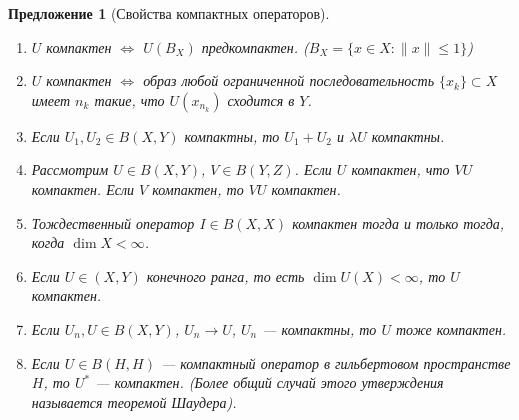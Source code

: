 \documentclass[11pt,openany,a4paper]{scrartcl}
\theoremstyle{plain}
\newtheorem{proposition}[theorem]{Предложение}
\theoremstyle{definition}
\begin{document}
\begin{proposition}[Свойства компактных операторов]
\mbox{}
    \begin{enumerate}
        \item $U$ компактен $\iff$ $U(B_X)$ предкомпактен.
        ($B_X = \{x \in X: \|x\| \leqslant 1\}$)
        \item $U$ компактен $\iff$ образ любой ограниченной последовательность
        $\{x_k\}\subset X$ имеет $n_k$ такие, что $U(x_{n_k})$ сходится в $Y$.
        \item Если $U_1, U_2 \in B(X, Y)$ компактны, то $U_1 + U_2$ и $\lambda U$ компактны.
        \item \label{compact_product}
        Рассмотрим $U \in B(X, Y)$, $V \in B(Y, Z)$. Если $U$ компактен, что $VU$ компактен.
        Если $V$ компактен, то $VU$ компактен.
        \item Тождественный оператор $I \in B(X, X)$ компактен тогда и только тогда, 
        когда $\dim X < \infty$.
        \item Если $U \in (X, Y)$ конечного ранга, то есть $\dim U(X) < \infty$, то $U$
        компактен.
        \item Если $U_n, U \in B(X, Y)$, $U_n \to U$, $U_n$ — компактны, то $U$ тоже 
        компактен.
        \item Если $U \in B(H, H)$ — компактный оператор в гильбертовом пространстве $H$, то
        $U^\ast$ — компактен.
        (Более общий случай этого утверждения называется теоремой Шаудера).
    \end{enumerate}
\end{proposition}
\end{document}
